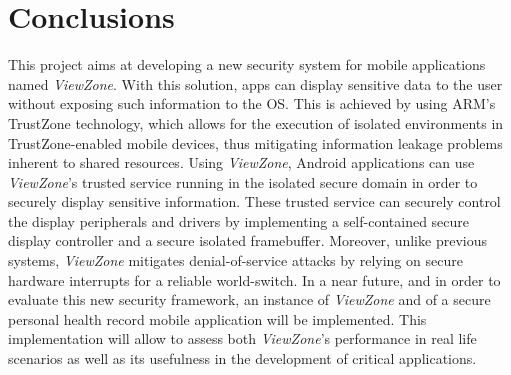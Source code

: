 
% 
% 

\section{Conclusions}
\label{sec:conclusion}

This project aims at developing a new security system for mobile applications named \emph{ViewZone}. With this solution, apps can display sensitive data to the user without exposing such information to the OS. This is achieved by using ARM's TrustZone technology, which allows for the execution of isolated environments in TrustZone-enabled mobile devices, thus mitigating information leakage problems inherent to shared resources. Using \emph{ViewZone}, Android applications can use \emph{ViewZone}'s trusted service running in the isolated secure domain in order to securely display sensitive information. These trusted service can securely control the display peripherals and drivers by implementing a self-contained secure display controller and a secure isolated framebuffer. Moreover, unlike previous systems, \emph{ViewZone} mitigates denial-of-service attacks by relying on secure hardware interrupts for a reliable world-switch. In a near future, and in order to evaluate this new security framework, an instance of \emph{ViewZone} and of a secure personal health record mobile application will be implemented. This implementation will allow to assess both \emph{ViewZone}'s performance in real life scenarios as well as its usefulness in the development of critical applications.